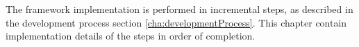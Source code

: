 
The framework implementation is performed in incremental steps, as described in the development process section \ref{cha:developmentProcess}. This chapter contain implementation details of the steps in order of completion.